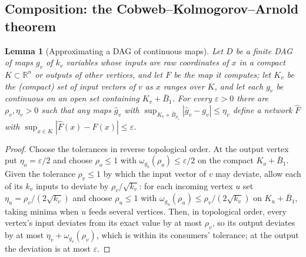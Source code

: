 \documentclass[11pt]{article}
\newtheorem{lemma}[theorem]{Lemma}
\theoremstyle{definition}
\theoremstyle{remark}
\newcommand{\R}{\mathbb{R}}
\begin{document}
\subsection{Composition: the Cobweb--Kolmogorov--Arnold theorem}

\begin{lemma}[Approximating a DAG of continuous maps]\label{lem:dag}
Let $D$ be a finite DAG of maps $g_v$ of $k_v$ variables whose inputs are raw
coordinates of $x$ in a compact $K\subset\R^n$ or outputs of other vertices, and let $F$ be
the map it computes; let $K_v$ be the (compact) set of input vectors of $v$ as $x$ ranges
over $K$, and let each $g_v$ be continuous on an open set containing $K_v+\bar B_1$.  For every $\varepsilon>0$ there are $\rho_v,\eta_v>0$ such that any maps
$\hat g_v$ with $\sup_{K_v+\bar B_{\rho_v}}|\hat g_v-g_v|\le\eta_v$ define a network
$\hat F$ with $\sup_{x\in K}|\hat F(x)-F(x)|\le\varepsilon$.
\end{lemma}
\begin{proof}
Choose the tolerances in reverse topological order.  At the output vertex put
$\eta_o=\varepsilon/2$ and choose $\rho_o\le1$ with
$\omega_{g_o}(\rho_o)\le\varepsilon/2$ on the compact $K_o+\bar B_1$.  Given the
tolerance $\rho_v\le1$ by which the input vector of $v$ may deviate, allow each of its
$k_v$ inputs to deviate by $\rho_v/\sqrt{k_v}$: for each incoming vertex $u$ set
$\eta_u=\rho_v/(2\sqrt{k_v})$ and choose $\rho_u\le1$ with
$\omega_{g_u}(\rho_u)\le\rho_v/(2\sqrt{k_v})$ on $K_u+\bar B_1$, taking minima when $u$
feeds several vertices.  Then, in topological order, every vertex's input deviates from
its exact value by at most $\rho_v$, so its output deviates by at most
$\eta_v+\omega_{g_v}(\rho_v)$, which is within its consumers' tolerance; at the output
the deviation is at most $\varepsilon$.
\end{proof}
\end{document}

